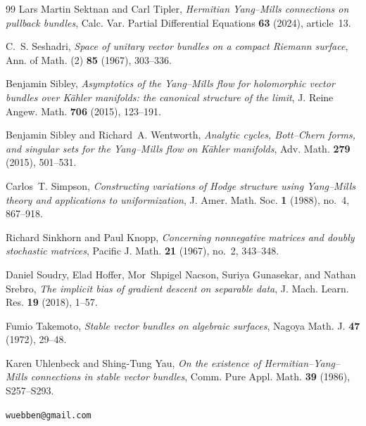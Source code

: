 \documentclass[11pt]{amsart}
\theoremstyle{definition}
\theoremstyle{remark}
\begin{document}
\begin{thebibliography}{99}
Lars Martin Sektnan and Carl Tipler, \emph{Hermitian {Y}ang--{M}ills
connections on pullback bundles}, Calc. Var. Partial Differential
Equations \textbf{63} (2024), article~13.

C.~S. Seshadri, \emph{Space of unitary vector bundles on a compact
{R}iemann surface}, Ann. of Math. (2) \textbf{85} (1967), 303--336.

Benjamin Sibley, \emph{Asymptotics of the {Y}ang--{M}ills flow for
holomorphic vector bundles over {K}\"ahler manifolds: the canonical
structure of the limit}, J. Reine Angew. Math. \textbf{706} (2015),
123--191.

Benjamin Sibley and Richard~A. Wentworth, \emph{Analytic cycles,
{B}ott--{C}hern forms, and singular sets for the {Y}ang--{M}ills flow on
{K}\"ahler manifolds}, Adv. Math. \textbf{279} (2015), 501--531.

Carlos~T. Simpson, \emph{Constructing variations of {H}odge structure
using {Y}ang--{M}ills theory and applications to uniformization},
J. Amer. Math. Soc. \textbf{1} (1988), no.~4, 867--918.

Richard Sinkhorn and Paul Knopp, \emph{Concerning nonnegative matrices
and doubly stochastic matrices}, Pacific J. Math. \textbf{21} (1967),
no.~2, 343--348.

Daniel Soudry, Elad Hoffer, Mor~Shpigel Nacson, Suriya Gunasekar, and
Nathan Srebro, \emph{The implicit bias of gradient descent on separable
data}, J. Mach. Learn. Res. \textbf{19} (2018), 1--57.

Fumio Takemoto, \emph{Stable vector bundles on algebraic surfaces},
Nagoya Math. J. \textbf{47} (1972), 29--48.

Karen Uhlenbeck and Shing-Tung Yau, \emph{On the existence of
{H}ermitian--{Y}ang--{M}ills connections in stable vector bundles},
Comm. Pure Appl. Math. \textbf{39} (1986), S257--S293.

\end{thebibliography}

\bigskip
{}
\texttt{wuebben@gmail.com}
\end{document}
